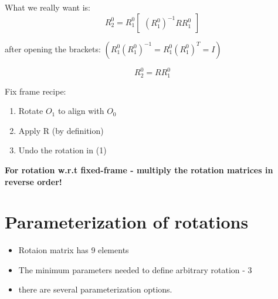 \documentclass{article}
\begin{document}
What we really want is:\\
$$R^{0}_2 = R^{0}_1\begin{bmatrix}
(R^{0}_1)^{-1}RR^{0}_{1}
\end{bmatrix}  $$

after opening the brackets: 
$ ( R^{0}_1(R^{0}_1)^{-1} = R^{0}_1(R^{0}_1)^{T} = I ) $

$$R^{0}_2 = RR^{0}_{1}  $$

Fix frame recipe:
\begin{enumerate}
    \item Rotate $O_1$ to align with $O_0$
    \item Apply R (by definition)
    \item Undo the rotation in (1)
\end{enumerate}

\textbf{For rotation w.r.t fixed-frame - multiply the rotation matrices in reverse order!}

\section{Parameterization of rotations}
\begin{itemize}
    \item Rotaion matrix has 9 elements
    \item The minimum parameters needed to define arbitrary rotation - 3
    \item there are several parameterization options.
\end{itemize}
\end{document}
